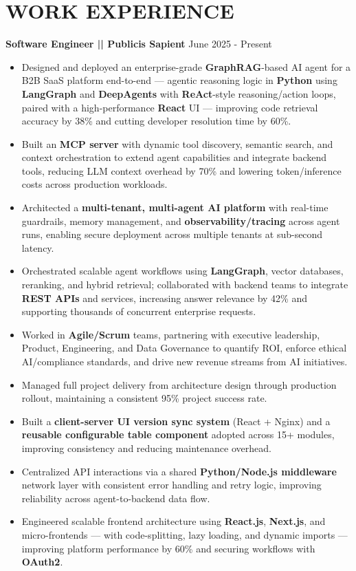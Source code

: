 \documentclass[100pt,a4paper]{article}
\begin{document}
\section*{WORK EXPERIENCE}
\textbf{Software Engineer || Publicis Sapient}
\hfill June 2025 - Present
\begin{itemize}
\vspace{2pt}
\item {Designed and deployed an enterprise-grade \textbf{GraphRAG}-based AI agent for a B2B SaaS platform end-to-end — agentic reasoning logic in \textbf{Python} using \textbf{LangGraph} and \textbf{DeepAgents} with \textbf{ReAct}-style reasoning/action loops, paired with a high-performance \textbf{React} UI — improving code retrieval accuracy by 38\% and cutting developer resolution time by 60\%.}
\item {Built an \textbf{MCP server} with dynamic tool discovery, semantic search, and context orchestration to extend agent capabilities and integrate backend tools, reducing LLM context overhead by 70\% and lowering token/inference costs across production workloads.}
\item {Architected a \textbf{multi-tenant, multi-agent AI platform} with real-time guardrails, memory management, and \textbf{observability/tracing} across agent runs, enabling secure deployment across multiple tenants at sub-second latency.}
\item {Orchestrated scalable agent workflows using \textbf{LangGraph}, vector databases, reranking, and hybrid retrieval; collaborated with backend teams to integrate \textbf{REST APIs} and services, increasing answer relevance by 42\% and supporting thousands of concurrent enterprise requests.}
\item {Worked in \textbf{Agile/Scrum} teams, partnering with executive leadership, Product, Engineering, and Data Governance to quantify ROI, enforce ethical AI/compliance standards, and drive new revenue streams from AI initiatives.}
\item {Managed full project delivery from architecture design through production rollout, maintaining a consistent 95\% project success rate.}
\item {Built a \textbf{client-server UI version sync system} (React + Nginx) and a \textbf{reusable configurable table component} adopted across 15+ modules, improving consistency and reducing maintenance overhead.}
\item {Centralized API interactions via a shared \textbf{Python/Node.js middleware} network layer with consistent error handling and retry logic, improving reliability across agent-to-backend data flow.}
\item {Engineered scalable frontend architecture using \textbf{React.js}, \textbf{Next.js}, and micro-frontends — with code-splitting, lazy loading, and dynamic imports — improving platform performance by 60\% and securing workflows with \textbf{OAuth2}.}
\end{itemize}
\end{document}
